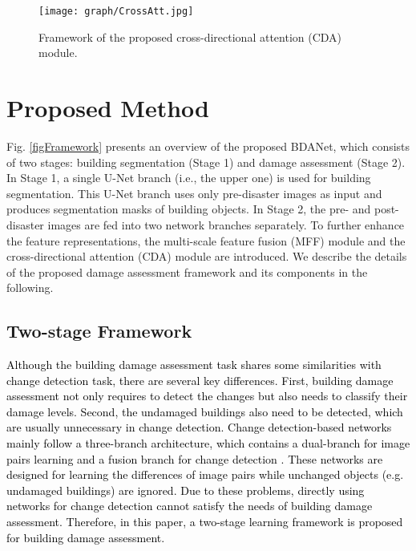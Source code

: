 \documentclass[journal]{IEEEtran}
\begin{document}
\begin{figure*}[!t]
\centering
	\texttt{[image: graph/CrossAtt.jpg]}
\caption{Framework of the proposed cross-directional attention (CDA) module. }
\label{figCross}
\end{figure*}


\section{Proposed Method}
\label{SecMethod}
Fig. \ref{figFramework} presents an overview of the proposed BDANet, which consists of two stages: building segmentation (Stage 1) and damage assessment (Stage 2). In Stage 1, a single U-Net branch (i.e., the upper one) is used for building segmentation. This U-Net branch uses only pre-disaster images as input and produces segmentation masks of building objects. In Stage 2, the pre- and post-disaster images are fed into two network branches separately. To further enhance the feature representations, the multi-scale feature fusion (MFF) module and the cross-directional attention (CDA) module are introduced. We describe the details of the proposed damage assessment framework and its components in the following. 

\subsection{Two-stage Framework} 
\textcolor{black}{Although the building damage assessment task shares some similarities with change detection task, there are several key differences. First, building damage assessment not only requires to detect the changes but also needs to classify their damage levels. Second, the undamaged buildings also need to be detected, which are usually unnecessary in change detection. Change detection-based networks mainly follow a three-branch architecture, which contains a dual-branch for image pairs learning and a fusion branch for change detection \cite{houWNetCDGANBitemporal2020, daudtFullyConvolutionalSiamese2018}. These networks are designed for learning the differences of image pairs while unchanged objects (e.g. undamaged buildings) are ignored. Due to these problems, directly using networks for change detection cannot satisfy the needs of building damage assessment. Therefore, in this paper, a two-stage learning framework is proposed for building damage assessment.}
\end{document}
